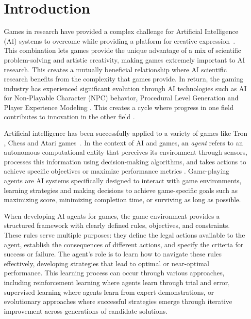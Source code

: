 \documentclass[a4paper,12pt]{article}
\begin{document}
\newpage

\section{Introduction}
Games in research have provided a complex challenge for Artificial Intelligence (AI) systems to overcome while providing a platform for creative expression~\cite{Aiforgames}.
This combination lets games provide the unique advantage of a mix of scientific problem-solving and artistic creativity, making games extremely important to AI research.
This creates a mutually beneficial relationship where AI scientific research benefits from the complexity that games provide.
In return, the gaming industry has experienced significant evolution through AI technologies such as AI for Non-Playable Character (NPC) behavior, Procedural Level Generation and Player Experience Modeling \cite{AiInGames}.
This creates a cycle where progress in one field contributes to innovation in the other field \cite{Aiforgames}.

Artificial intelligence has been successfully applied to a variety of games like Tron \cite{tron}, Chess \cite{chess} and Atari games~\cite{atari}. 
In the context of AI and games, an \textit{agent} refers to an autonomous computational entity that perceives its environment through sensors, processes this information using decision-making algorithms, and takes actions to achieve specific objectives or maximize performance metrics \cite{AImodern}. 
Game-playing agents are AI systems specifically designed to interact with game environments, learning strategies and making decisions to achieve game-specific goals such as maximizing score, minimizing completion time, or surviving as long as possible.

When developing AI agents for games, the game environment provides a structured framework with clearly defined rules, objectives, and constraints. 
These rules serve multiple purposes: they define the legal actions available to the agent, establish the consequences of different actions, and specify the criteria for success or failure. 
The agent's role is to learn how to navigate these rules effectively, developing strategies that lead to optimal or near-optimal performance. 
This learning process can occur through various approaches, including reinforcement learning where agents learn through trial and error, supervised learning where agents learn from expert demonstrations, or evolutionary approaches where successful strategies emerge through iterative improvement across generations of candidate solutions.
\end{document}
